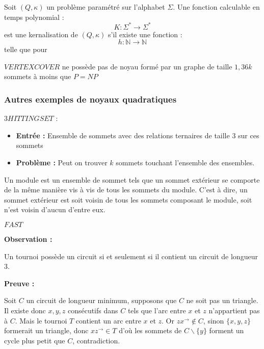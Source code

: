 \documentclass[a4paper, 11pt]{report}
\begin{document}


\begin{df}
    Soit $(Q, \kappa)$ un problème paramétré sur l'alphabet $\Sigma$. Une fonction calculable en
    temps polynomial : $$
    K : \Sigma^* \longrightarrow \Sigma^* $$
    est une kernalisation de $(Q, \kappa)$ s'il existe une fonction : $$
    h : \mathbb{N} \longrightarrow \mathbb{N} $$
    telle que pour 
\end{df}

\begin{thrm}
\end{thrm}

\begin{thrm}
    $VERTEX COVER$ ne possède pas de noyau formé par un graphe de taille $1,36 k$ sommets à moins
    que $P = NP$
\end{thrm}

\subsubsection{Autres exemples de noyaux quadratiques}

$3 HITTING SET$ :
\begin{itemize}
    \item \textbf{Entrée :} Ensemble de sommets avec des relations ternaires de taille $3$ sur ces
        sommets
    \item \textbf{Problème :} Peut on trouver $k$ sommets touchant l'ensemble des ensembles.
\end{itemize}

\begin{df}
    Un module est un ensemble de sommet tels que un sommet extérieur se comporte de la même manière
    vis à vis de tous les sommets du module. C'est à dire, un sommet extérieur est soit voisin de
    tous les sommets composant le module, soit n'est voisin d'aucun d'entre eux.
\end{df}

$FAST$

\textbf{Observation :}

Un tournoi possède un circuit si et seulement si il contient un circuit de longueur $3$.

\textbf{Preuve :}

Soit $C$ un circuit de longueur minimum, supposons que $C$ ne soit pas un triangle. Il existe donc
$x, y, z$ consécutifs dans $C$ tels que l'arc entre $x$ et $z$ n'appartient pas à $C$. Mais le
tournoi $T$ contient un arc entre $x$ et $z$. Or $zx ^ \rightarrow \not \in C$, sinon $\{x, y, z\}$
formerait un triangle, donc $xz ^ \rightarrow \in T$ d'où les sommets de $C \backslash \{y\}$
forment un cycle plus petit que $C$, contradiction.
\end{document}
